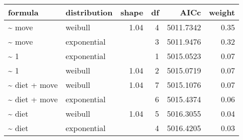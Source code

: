 \begin{table}[ht]
\centering
\begin{tabular}{llrrrr}
 formula & distribution & shape & df & AICc & weight \\ 
  \hline
\~{} move & weibull & 1.04 & 4 & 5011.7342 & 0.35 \\ 
  \~{} move & exponential &  & 3 & 5011.9476 & 0.32 \\ 
  \~{} 1 & exponential &  & 1 & 5015.0523 & 0.07 \\ 
  \~{} 1 & weibull & 1.04 & 2 & 5015.0719 & 0.07 \\ 
  \~{} diet + move & weibull & 1.04 & 7 & 5015.1076 & 0.07 \\ 
  \~{} diet + move & exponential &  & 6 & 5015.4374 & 0.06 \\ 
  \~{} diet & weibull & 1.04 & 5 & 5016.3055 & 0.04 \\ 
  \~{} diet & exponential &  & 4 & 5016.4205 & 0.03 \\ 
  \end{tabular}
\label{tab:nag}
\end{table}
